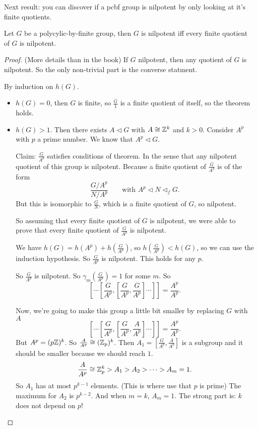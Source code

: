 Next result: you can discover if a pcbf group is nilpotent by only looking at it's finite quotients.


\begin{theorem}[2]
    Let $G$ be a polycylic-by-finite group, then $G$ is nilpotent iff every finite quotient of $G$ is nilpotent.
\end{theorem}
\begin{proof}
    (More details than in the book)
    If $G$ nilpotent, then any quotient of $G$ is nilpotent.
    So the only non-trivial part is the converse statment.

    By induction on $h(G)$.
     \begin{itemize}
         \item $h(G) = 0$, then  $G$ is finite, so $\frac{G}{1}$ is a finite quotient of itself, so the theorem holds.
         \item $h(G) > 1$. Then there exists $A \triangleleft G$ with $A \cong \mathbb{Z}^{k}$ and $k > 0$.
             Consider  $A^{p}$ with $p$ a prime number.
             We know that $A^{p} \triangleleft G$.

             Claim: $\frac{G}{A^{p}}$ satisfies conditions of theorem. In the sense that any nilpotent quotient of this group is nilpotent.
             Because a finite quotient of $\frac{G}{A^{p}}$ is of the form 
             \[
                 \frac{ G / A^{p}}{N / A^{p}} \qquad \text{with $A^{p} \triangleleft  N \triangleleft_f G$}
             .\] 
             But  this is isomorphic to $\frac{G}{N}$, which is a finite quotient of $G$, so nilpotent.

             So assuming that every finite quotient of $G$ is nilpotent, we were able to prove that every finite quotient of $\frac{G}{A^{p}}$ is nilpotent. 

             We have $h(G) = h(A^{p}) + h(\frac{G}{A^{p}})$, so $h(\frac{G}{A^{p}}) < h(G)$, so we can use the induction hypothesis.
             So $\frac{G}{A^{p}}$ is nilpotent.
             This holds for any $p$.

             So $\frac{G}{A^{p}}$ is nilpotent. So $\gamma_m (\frac{G}{A^{p}}) = 1$ for some $m$.
             So \[
                 \left[\cdots\left[\frac{G}{A^{p}}, \left[\frac{G}{A^{p}}, \frac{G}{A^{p}}\right]\cdots \right]\right] = \frac{A^p}{A^p}.  
             \]

             Now, we're going to make this group a little bit smaller by replacing $G$ with $A$
\[
                 \left[\cdots\left[\frac{G}{A^{p}}, \left[\frac{G}{A^{p}}, \frac{A}{A^{p}}\right]\cdots \right]\right] = \frac{A^p}{A^p}.  
             \]
             But $A^{p} = (p\mathbb{Z})^{k}$. So $\frac{A}{A^{p}} \cong (\mathbb{Z}_p)^{k}$.
             Then $A_1 = [\frac{G}{A^{p}}, \frac{A}{A^{p}}]$ is a subgroup and it should be smaller because we should reach $1$.
             \[
                 \frac{A}{A^{p}} \cong \mathbb{Z}_p^{k} > A_1 > A_2 > \cdots > A_m = 1
             .\] 
             So $ A_1$ has at most $p^{k-1}$ elements. (This is where use that $p$ is prime)
             The maximum for $ A_2$ is $p^{k-2}$.
             And when $m =k$,  $A_m = 1$.
             The strong part is:  $k$ does not depend on $p$!


\end{itemize}
\end{proof}
